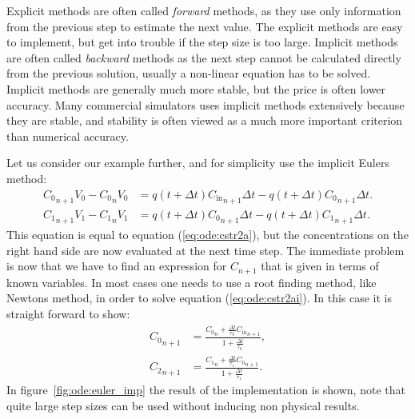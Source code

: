 \documentclass[graybox,sectrefs,envcountresetchap,open=right,final]{svmonodo}
\newenvironment{graybox2admon}[1][]{
\begin{graybox2mdframed}[frametitle=#1]
}
{
\end{graybox2mdframed}
}
\begin{document}
\begin{graybox2admon}[Explicit and Implicit methods]
Explicit methods are often called \emph{forward} methods, as they use only information from the previous step to estimate the next value. The explicit
methods are easy to implement, but get into trouble if the step size is too large. Implicit methods are often called \emph{backward} methods as the next 
step cannot be calculated directly from the previous solution, usually a non-linear equation has to be solved. Implicit methods are generally much
more stable, but the price is often lower accuracy. Many commercial simulators uses implicit methods extensively because they are stable, and stability is often viewed
as a much more important criterion than numerical accuracy.
\end{graybox2admon}



Let us consider our example further, and for simplicity use the implicit Eulers method:
\begin{align}
{C_0}_{n+1}V_0 - {C_0}_nV_0 &= q(t+\Delta t){C_\text{in}}_{n+1}\Delta t -
q(t+\Delta t){C_0}_{n+1}\Delta t.\nonumber\\ 
{C_1}_{n+1}V_1 - {C_1}_nV_1 &= q(t+\Delta t){C_0}_{n+1}\Delta t - q(t+\Delta t){C_1}_{n+1}\Delta t.
\label{eq:ode:cstr2ai}
\end{align}
This equation is equal to equation (\ref{eq:ode:cstr2a}), but the concentrations on the right hand side are now evaluated at the next time step.
The immediate problem is now that we have to find an expression for $C_{n+1}$ that is given in terms of known variables. In most cases one needs
to use a root finding method, like Newtons method, in order to solve equation (\ref{eq:ode:cstr2ai}). In this case it is straight forward to show:
\begin{align}
{C_0}_{n+1}&=\frac{{C_0}_n + \frac{\Delta t}{\tau_0}{C_\text{in}}_{n+1}}{1+\frac{\Delta t}{\tau_0}},\nonumber\\ 
{C_2}_{n+1}&=\frac{{C_1}_n + \frac{\Delta t}{\tau_1}{C_0}_{n+1}}{1+\frac{\Delta t}{\tau_1}}.\label{eq:ode:cstri1}
\end{align}
In figure~\ref{fig:ode:euler_imp} the result of the implementation is shown, note that quite large step sizes can be used without inducing non physical results.
\end{document}
